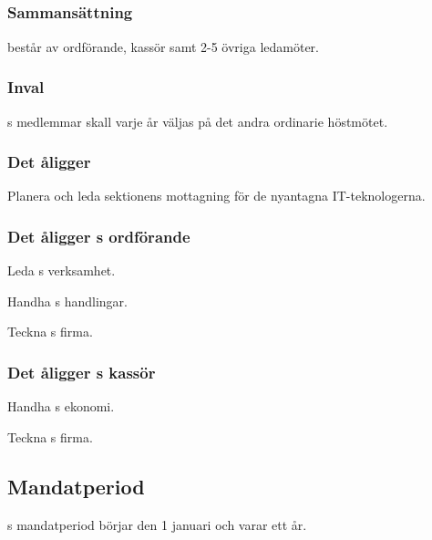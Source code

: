 \subsection{\NOLLKITFULL}
\subsubsection{Sammansättning}
\NOLLKIT{} består av ordförande, kassör samt 2-5 övriga ledamöter.

\subsubsection{Inval}
\NOLLKIT{}s medlemmar skall varje år väljas på det andra ordinarie höstmötet.

\subsubsection{Det åligger \NOLLKIT}
\begin{att}
	\item Planera och leda sektionens mottagning för de nyantagna IT-teknologerna.
\end{att}

\subsubsection{Det åligger \NOLLKIT{}s ordförande}
\begin{att}
	\item Leda \NOLLKIT{}s verksamhet.
	\item Handha \NOLLKIT{}s handlingar.
	\item Teckna \NOLLKIT{}s firma.
\end{att}

\subsubsection{Det åligger \NOLLKIT{}s kassör}
\begin{att}
	\item Handha \NOLLKIT{}s ekonomi.
	\item Teckna \NOLLKIT{}s firma.
\end{att}

\subsection{Mandatperiod}
\NOLLKIT{}s mandatperiod börjar den 1 januari och varar ett år.